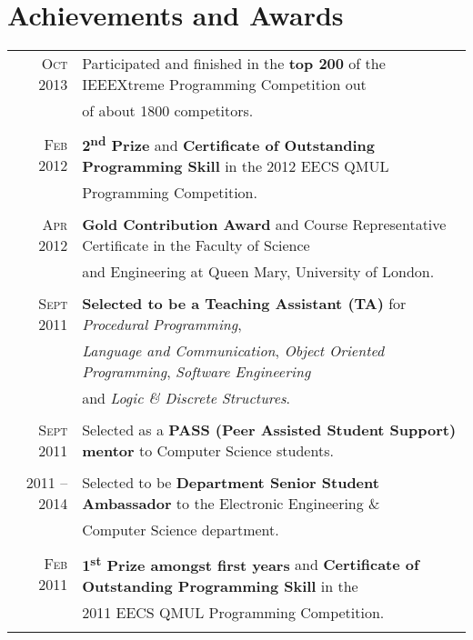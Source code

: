 \documentclass[a4paper,10pt]{article}
\begin{document}
\section{Achievements and Awards}
\begin{tabular}{rl}
  \textsc{Oct 2013} & Participated and finished in the \textbf{top 200} of the IEEEXtreme
  Programming Competition out\\& of about 1800 competitors.\\\\

  \textsc{Feb} 2012 & \textbf{2\textsuperscript{nd}  Prize} and \textbf{Certificate of Outstanding
  Programming Skill} in the 2012 EECS QMUL\\& Programming Competition.\\\\

  \textsc{Apr} 2012 & \textbf{Gold Contribution Award} and Course Representative Certificate in the
  Faculty of Science\\& and Engineering at Queen Mary, University of London.\\\\

  \textsc{Sept} 2011 & \textbf{Selected to be a Teaching Assistant (TA)} for
  \textit{Procedural Programming},\\& \textit{Language and  Communication}, \textit{Object
Oriented Programming}, \textit{Software Engineering}\\& and \textit{Logic \& Discrete Structures}.\\\\

  \textsc{Sept} 2011 & Selected as a \textbf{PASS (Peer Assisted Student Support) mentor} to
  Computer Science students.\\\\

  \textsc{2011 -- 2014} & Selected to be \textbf{Department Senior Student Ambassador} to the
  Electronic Engineering \&\\& Computer Science department.\\\\

  \textsc{Feb} 2011 & \textbf{1\textsuperscript{st} Prize amongst first years} and
  \textbf{Certificate of Outstanding Programming Skill} in the\\& 2011 EECS QMUL Programming
  Competition.\\\\


\end{tabular}
\end{document}

